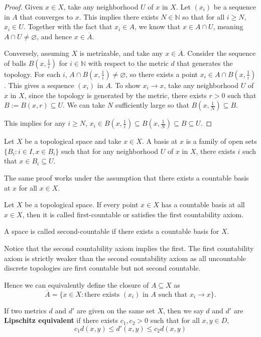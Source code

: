 \documentclass[article,11pt, reqno]{article}
\theoremstyle{remark}
\newcommand{\tb}{\textbf}
\newcommand{\mb}{\mathbb}
\newcommand{\<}{\langle}
\renewcommand{\>}{\rangle}
\begin{document}
\begin{proof}
    Given $x\in X$, take any neighborhood $U$ of $x$ in $X$. Let $(x_i)$ be a sequence in $A$ that converges to $x$. This implies there exists $N\in \mb N$ so that for all $i\geq N$, $x_i\in U$. Together with the fact that $x_i\in A$, we know that $x\in A\cap U$, meaning $A\cap U\neq\varnothing$, and hence $x\in\overline A$.

    Conversely, assuming $X$ is metrizable, and take any $x\in \overline A$. Consider the sequence of balls $B (x, \frac{1}{i})$ for $i\in \mb N$ with respect to the metric $d$ that generates the topology. For each $i$, $A\cap B(x, \frac{1}{i})\neq \varnothing$, so there exists a point $x_i\in A\cap B(x, \frac{1}{i})$. This gives a sequence $(x_i)$ in $A$. To show $x_i\rightarrow x$, take any neighborhood $U$ of $x$ in $X$, since the topology is generated by the metric, there exists $r>0$ such that $B:=B(x,r)\subseteq U$. We can take $N$ sufficiently large so that $B(x, \frac{1}{N})\subseteq B$.

    This implies for any $i\geq N$, $x_i\in B(x, \frac{1}{i})\subseteq B(x, \frac{1}{N})\subseteq B\subseteq U$.
\end{proof}

Let $X$ be a topological space and take $x\in X$. A basis at $x$ is a family of open sets $\{B_i:i\in I, x\in B_i\}$ such that for any neighborhood $U$ of $x$ in $X$, there exists $i$ such that $x\in B_i\subseteq U$.


The same proof works under the assumption that there exists a countable basis at $x$ for all $x\in X$.

Let $X$ be a topological space. If every point $x\in X$ has a countable basis at all $x\in X$, then it is called first-countable or satisfies the first countability axiom.

A space is called second-countable if there exists a countable basis for $X$.

Notice that the second countability axiom implies the first. The first countability axiom is strictly weaker than the second countability axiom as all uncountable discrete topologies are first countable but not second countable.

Hence we can equivalently define the closure of $A\subseteq X$ as
$$\overline A = \{x\in X: \text{there exists } (x_i) \text{ in  } A \text{ such that } x_i\rightarrow x\}.$$

If two metrics $d$ and $d'$ are given on the same set $X$, then we say $d$ and $d'$ are \tb{Lipschitz equivalent} if there exists $c_1, c_2>0$ such that for all $x,y\in D$, 
$$c_1d(x,y)\leq d'(x,y)\leq c_2 d(x,y)$$
\end{document}
